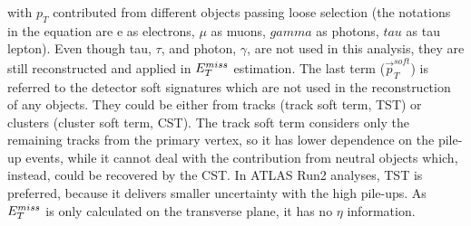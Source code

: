 with $p_{T}$ contributed from different objects passing loose selection (the notations in the equation are e as electrons, $\mu$ as muons, $gamma$ as photons, $tau$ as tau lepton). Even though tau, $\tau$, and photon, $\gamma$, are not used in this analysis, they are still reconstructed and applied in $E_{T}^{miss}$ estimation.  The last term ($\vec{p}_{T}^{soft}$) is referred to the detector soft signatures which are not used in the reconstruction of any objects. They could be either from tracks (track soft term, TST) or clusters (cluster soft term, CST). The track soft term considers only the remaining tracks from the primary vertex, so it has lower dependence on the pile-up events, while it cannot deal with the contribution from neutral objects which, instead, could be recovered by the CST. In ATLAS Run2 analyses, TST is preferred, because it delivers smaller uncertainty with the high pile-ups. As $E_{T}^{miss}$ is only calculated on the transverse plane, it has no $\eta$ information. 

